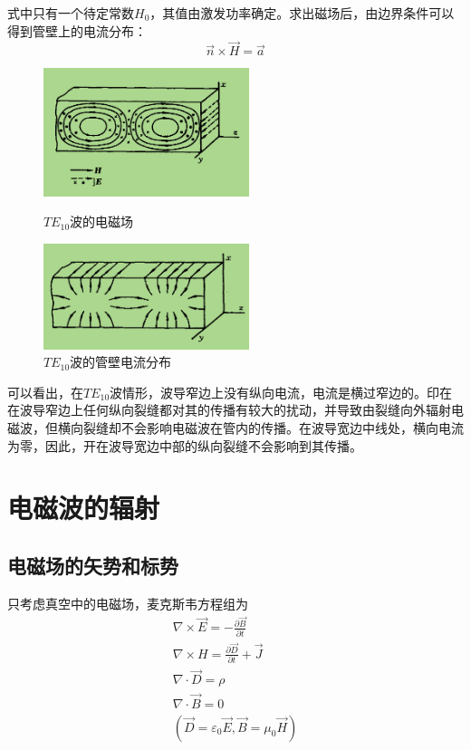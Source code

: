 \documentclass[UTF8]{ctexart}
\begin{document}
\noindent 式中只有一个待定常数$H_0$，其值由激发功率确定。求出磁场后，由边界条件可以得到管壁上的电流分布：
\begin{equation}
    \vec{n} \times \vec{H} = \vec{a}
\end{equation}

\begin{figure}[htbp]
   \centering
   \begin{minipage}[t]{0.48 \textwidth}
       \centering
       \includegraphics[width=6cm]{figure4-3.png}
       \caption{$TE_{10}$波的电磁场}
   \end{minipage}
   \begin{minipage}[t]{0.48 \textwidth}
       \centering
       \includegraphics[width=6cm]{figure4-4.png}
       \caption{$TE_{10}$波的管壁电流分布}
   \end{minipage}
   \label{figure4.3&4.4}
   \end{figure}

   可以看出，在$TE_{10}$波情形，波导窄边上没有纵向电流，电流是横过窄边的。印在在波导窄边上任何纵向裂缝都对其的传播有较大的扰动，并导致由裂缝向外辐射电磁波，但横向裂缝却不会影响电磁波在管内的传播。在波导宽边中线处，横向电流为零，因此，开在波导宽边中部的纵向裂缝不会影响到其传播。

   \section{电磁波的辐射}
   \subsection{电磁场的矢势和标势}
   只考虑真空中的电磁场，麦克斯韦方程组为
   \begin{equation}
   \begin{array}{l}{\nabla \times \vec{E}=-\frac{\partial \vec{B}}{\partial t}} \\ {\nabla \times H=\frac{\partial \vec{D}}{\partial t}+\vec{J}} \\ {\nabla \cdot \vec{D}=\rho} \\ {\nabla \cdot \vec{B}=0} \\ {\left(\vec{D}=\varepsilon_{0} \vec{E}, \vec{B}=\mu_{0} \vec{H}\right)}\end{array}
   \end{equation}
\end{document}
